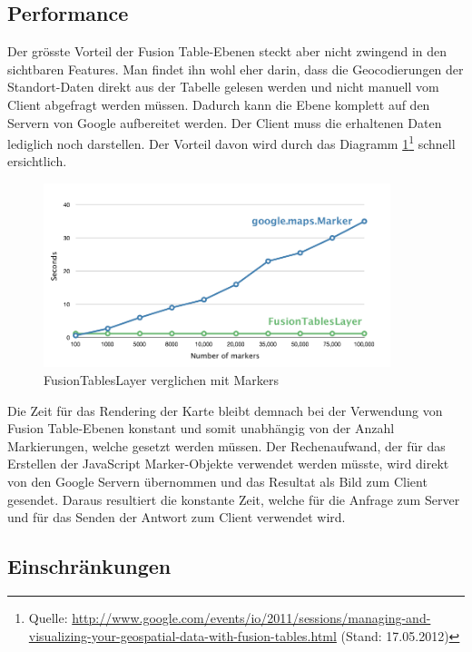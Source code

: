 \subsection{Performance}
Der grösste Vorteil der Fusion Table-Ebenen steckt aber nicht zwingend in den sichtbaren Features. Man findet ihn wohl eher darin, dass die Geocodierungen der Standort-Daten direkt aus der Tabelle gelesen werden und nicht manuell vom Client abgefragt werden müssen. Dadurch kann die Ebene komplett auf den Servern von Google aufbereitet werden. Der Client muss die erhaltenen Daten lediglich noch darstellen. Der Vorteil davon wird durch das Diagramm \ref{fusiontableslayer-compare_markers}\footnote{Quelle: \url{http://www.google.com/events/io/2011/sessions/managing-and-visualizing-your-geospatial-data-with-fusion-tables.html} (Stand: 17.05.2012)} schnell ersichtlich.

\begin{figure}[!ht]
	\centering
	\includegraphics[width=0.9\textwidth]{images/einfuehrung/gmap_fusiontableslayer_vs_markers}
	\caption{FusionTablesLayer verglichen mit Markers}
	\label{fusiontableslayer-compare_markers}
\end{figure}

Die Zeit für das Rendering der Karte bleibt demnach bei der Verwendung von Fusion Table-Ebenen konstant und somit unabhängig von der Anzahl Markierungen, welche gesetzt werden müssen. Der Rechenaufwand, der für das Erstellen der JavaScript Marker-Objekte verwendet werden müsste, wird direkt von den Google Servern übernommen und das Resultat als Bild zum Client gesendet. Daraus resultiert die konstante Zeit, welche für die Anfrage zum Server und für das Senden der Antwort zum Client verwendet wird.

\subsection{Einschränkungen}
